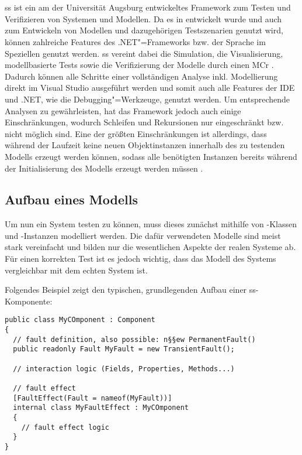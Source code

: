\section{}
\label{sec:ssharp}

\gls{ss} ist ein am \isse der Universität Augsburg entwickeltes Framework zum Testen und Verifizieren von Systemen und Modellen.
Da es in \cS entwickelt wurde und \cS auch zum Entwickeln von Modellen und dazugehörigen Testszenarien genutzt wird, können zahlreiche Features des .NET"=Frameworks bzw. der Sprache \cS im Speziellen genutzt werden.
\gls{ss} vereint dabei die Simulation, die Visualisierung, modellbasierte \glspl{Test} sowie die Verifizierung der Modelle durch einen \gls{MCr} \cite{Habermaier2015,Habermaier2016}.
Dadurch können alle Schritte einer vollständigen Analyse inkl. Modellierung direkt im Visual Studio ausgeführt werden und somit auch alle Features der IDE und .NET, wie \zB die Debugging"=Werkzeuge, genutzt werden.
Um entsprechende Analysen zu gewährleisten, hat das Framework jedoch auch einige Einschränkungen, wodurch \zB Schleifen und Rekursionen nur eingeschränkt bzw. nicht möglich sind.
Eine der größten Einschränkungen ist allerdings, dass während der Laufzeit keine neuen Objektinstanzen innerhalb des zu testenden Modells erzeugt werden können, sodass alle benötigten Instanzen bereits während der Initialisierung des Modells erzeugt werden müssen \cite{Habermaier2015}.

\subsection{Aufbau eines Modells}
\label{subsec:ssharpModel}


Um nun ein System testen zu können, muss dieses zunächst mithilfe von \cS-Klassen und -Instanzen modelliert werden.
Die dafür verwendeten Modelle sind meist stark vereinfacht und bilden nur die wesentlichen Aspekte der realen Systeme ab.
Für einen korrekten \gls{Test} ist es jedoch wichtig, dass das Modell des Systems vergleichbar mit dem echten System ist.

Folgendes Beispiel zeigt den typischen, grundlegenden Aufbau einer \gls{ss}-Komponente:

\begin{lstlisting}[label=lst:ssExample,style=cs,
caption={Grundlegender Aufbau einer \acrshort{ss}-Komponente.}]
public class MyCOmponent : Component
{
  // fault definition, also possible: n§§ew PermanentFault()
  public readonly Fault MyFault = new TransientFault();
  
  // interaction logic (Fields, Properties, Methods...)
  
  // fault effect
  [FaultEffect(Fault = nameof(MyFault))]
  internal class MyFaultEffect : MyCOmponent
  {
    // fault effect logic
  }
}
\end{lstlisting}

